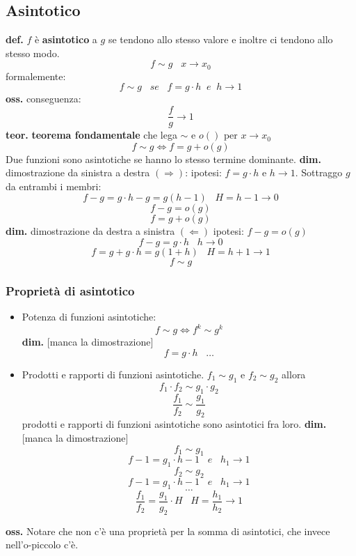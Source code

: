 \subsection*{Asintotico}
\textbf{def.} $f$ è \textbf{asintotico} a $g$ se tendono allo stesso valore e inoltre ci tendono allo stesso modo.
\[
    f \sim g \;\;\; x \rightarrow x_0
\]
formalemente:
\[
    f \sim g \;\;\; se \;\;\; f=g \cdot  h \;\; e \;\; h\rightarrow 1
\]
\textbf{oss.} conseguenza:
\[
    \frac{f}{g} \rightarrow 1
\]
\newline
\newline
\textbf{teor.} \textbf{teorema fondamentale} che lega $ \sim $ e $o()$  
\newline
per $x\rightarrow x_0$
\[
    f \sim g \Longleftrightarrow f = g + o(g)
\]
Due funzioni sono asintotiche se hanno lo stesso termine dominante.
\newline
\newline
\textbf{dim.} dimostrazione da sinistra a destra $(\Rightarrow)$:
\newline
ipotesi: $ f= g \cdot  h$ e $ h \rightarrow 1$. Sottraggo $g$ da entrambi i membri:
\[
    f-g = g \cdot h -g = g(h-1) \;\;\; H = h-1  \longrightarrow 0
\]
\[
    f-g = o(g)
\]
\[
    f=g+o(g)
\]
\textbf{dim.} dimostrazione da destra a sinistra $(\Leftarrow)$
\newline
ipotesi: $f-g = o(g)$
\[
    f-g = g \cdot h \;\;\;h \rightarrow 0
\]
\[
    f = g + g \cdot h = g (1+h) \;\;\; H = h+1 \rightarrow 1
\]
\[
    f \sim g
\]
\subsubsection*{Proprietà di asintotico}
\begin{itemize}
    \item Potenza di funzioni asintotiche:
        \[
            f \sim g \Longleftrightarrow    f^k \sim g^k 
        \] 
        \newline
        \textbf{dim.} [manca la dimostrazione]
        \[
            f = g \cdot  h \;\;\; \dots
        \] 
    \item Prodotti e rapporti di funzioni asintotiche.
        \newline
        $f_1 \sim g_1$ e $f_2 \sim  g_2$ allora
        \[
            f_1 \cdot  f_2 \sim  g_1 \cdot  g_2    
        \]
        \[
            \frac{f_1}{f_2} \sim \frac{g_1}{g_2}
        \]
        prodotti e rapporti di funzioni asintotiche sono asintotici fra loro.
        \newline
        \newline
        \textbf{dim.} [manca la dimostrazione]
        \[
            f_1 \sim  g_1
        \] 
        \[
            f-1 = g_1 \cdot  h-1 \;\;\; e \;\;\; h_1 \rightarrow 1
        \]
        \[
            f_2 \sim  g_2
        \] 
        \[
            f-1 = g_1 \cdot  h-1 \;\;\; e \;\;\; h_1 \rightarrow 1
        \]
        \[
            \dots
        \]
        \[
            \frac{f_1}{f_2} = \frac{g_1}{g_2} \cdot H \;\;\; H = \frac{h_1}{h_2}\rightarrow 1
        \] 
\end{itemize}
\textbf{oss.} Notare che non c'è una proprietà per la somma di asintotici, che invece nell'o-piccolo c'è.
